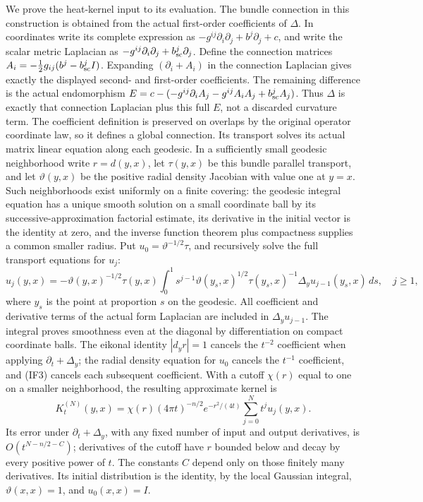 \documentclass[
  11pt,
]{article}
\begin{document}
We prove the heat-kernel input to its evaluation. The bundle connection
in this construction is obtained from the actual first-order
coefficients of \(\Delta\). In coordinates write its complete expression
as \(-g^{ij}\partial_i\partial_j+b^j\partial_j+c\), and write the scalar
metric Laplacian as
\(-g^{ij}\partial_i\partial_j+b^j_{\rm sc}\partial_j\). Define the
connection matrices \(A_i=-\tfrac12g_{ij}(b^j-b^j_{\rm sc}I)\).
Expanding \((\partial_i+A_i)\) in the connection Laplacian gives exactly
the displayed second- and first-order coefficients. The remaining
difference is the actual endomorphism
\(E=c-(-g^{ij}\partial_iA_j-g^{ij}A_iA_j+b^j_{\rm sc}A_j)\). Thus
\(\Delta\) is exactly that connection Laplacian plus this full \(E\),
not a discarded curvature term. The coefficient definition is preserved
on overlaps by the original operator coordinate law, so it defines a
global connection. Its transport solves its actual matrix linear
equation along each geodesic. In a sufficiently small geodesic
neighborhood write \(r=d(y,x)\), let \(\tau(y,x)\) be this bundle
parallel transport, and let \(\vartheta(y,x)\) be the positive radial
density Jacobian with value one at \(y=x\). Such neighborhoods exist
uniformly on a finite covering: the geodesic integral equation has a
unique smooth solution on a small coordinate ball by its
successive-approximation factorial estimate, its derivative in the
initial vector is the identity at zero, and the inverse function theorem
plus compactness supplies a common smaller radius. Put
\(u_0=\vartheta^{-1/2}\tau\), and recursively solve the full transport
equations for \(u_j\): \[
 u_j(y,x)=-\vartheta(y,x)^{-1/2}\tau(y,x)
  \int_0^1 s^{j-1}\vartheta(y_s,x)^{1/2}
       \tau(y_s,x)^{-1}\Delta_yu_{j-1}(y_s,x)\,ds,
 \quad j\geq1,
\tag{IF3}
\] where \(y_s\) is the point at proportion \(s\) on the geodesic. All
coefficient and derivative terms of the actual form Laplacian are
included in \(\Delta_yu_{j-1}\). The integral proves smoothness even at
the diagonal by differentiation on compact coordinate balls. The eikonal
identity \(|d_y r|=1\) cancels the \(t^{-2}\) coefficient when applying
\(\partial_t+\Delta_y\); the radial density equation for \(u_0\) cancels
the \(t^{-1}\) coefficient, and (IF3) cancels each subsequent
coefficient. With a cutoff \(\chi(r)\) equal to one on a smaller
neighborhood, the resulting approximate kernel is \[
 K^{(N)}_t(y,x)=\chi(r)(4\pi t)^{-n/2}
                   e^{-r^2/(4t)}\sum_{j=0}^N t^j u_j(y,x).
\tag{IF4}
\] Its error under \(\partial_t+\Delta_y\), with any fixed number of
input and output derivatives, is \(O(t^{N-n/2-C})\); derivatives of the
cutoff have \(r\) bounded below and decay by every positive power of
\(t\). The constants \(C\) depend only on those finitely many
derivatives. Its initial distribution is the identity, by the local
Gaussian integral, \(\vartheta(x,x)=1\), and \(u_0(x,x)=I\).
\end{document}
